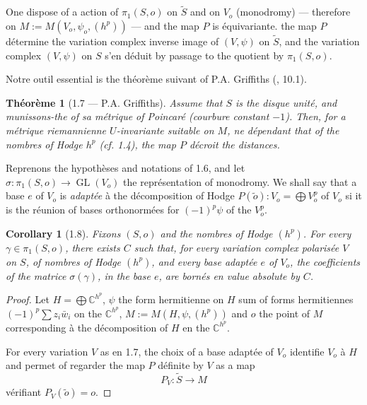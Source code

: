 \documentclass[12pt,a4paper]{article}
\theoremstyle{plain}
\newtheorem{theorem}{Th\'{e}or\`{e}me}[section]
\newtheorem{corollary}{Corollary}[section]
\theoremstyle{definition}
\DeclareMathOperator{\GL}{GL}
\newcommand{\CC}{\mathbb{C}}
\begin{document}
{One dispose of a action of $\pi_{1}(S,o)$ on $\widetilde{S}$ and on $V_{o}$ (monodromy) --- therefore on $M := M(V_{o}, \psi_{o}, (h^{p}))$ --- and the map $P$ is \'{e}quivariante. the map $P$ d\'{e}termine the variation complex inverse image of $(V, \psi)$ on $\widetilde{S}$, and the variation complex $(V, \psi)$ on $S$ s'en d\'{e}duit by passage to the quotient by $\pi_{1}(S,o)$.

Notre outil essential is the th\'{e}or\`{e}me suivant of P.A. Griffiths (\cite{GriffithsBull}, 10.1).

\begin{theorem}[1.7 --- P.A. Griffiths]
Assume that $S$ is the disque unit\'{e}, and munissons-the of sa m\'{e}trique of Poincar\'{e} (courbure constant $-1$). Then, for a m\'{e}trique riemannienne $U$-invariante suitable on $M$, ne d\'{e}pendant that of the nombres of Hodge $h^{p}$ (cf. 1.4), the map $P$ d\'{e}croit the distances.
\end{theorem}

Reprenons the hypoth\`{e}ses and notations of 1.6, and let $\sigma : \pi_{1}(S,o) \to \GL(V_{o})$ the repr\'{e}sentation of monodromy. We shall say that a base $e$ of $V_{o}$ is \emph{adapt\'{e}e} \`{a} the d\'{e}composition of Hodge $P(\tilde{o}) : V_{o} = \bigoplus V_{o}^{p}$ of $V_{o}$ si it is the r\'{e}union of bases orthonorm\'{e}es for $(-1)^{p}\psi$ of the $V_{o}^{p}$.

\begin{corollary}[1.8]
Fixons $(S,o)$ and the nombres of Hodge $(h^{p})$. For every $\gamma \in \pi_{1}(S,o)$, there exists $C$ such that, for every variation complex polaris\'{e}e $V$ on $S$, of nombres of Hodge $(h^{p})$, and every base adapt\'{e}e $e$ of $V_{o}$, the coefficients of the matrice $\sigma(\gamma)$, in the base $e$, are born\'{e}s en value absolute by $C$.
\end{corollary}

\begin{proof}
Let $H = \bigoplus \CC^{h^{p}}$, $\psi$ the form hermitienne on $H$ sum of forms hermitiennes $(-1)^{p}\sum z_{i}\bar{w}_{i}$ on the $\CC^{h^{p}}$, $M := M(H, \psi, (h^{p}))$ and $o$ the point of $M$ corresponding \`{a} the d\'{e}composition of $H$ en the $\CC^{h^{p}}$.

For every variation $V$ as en 1.7, the choix of a base adapt\'{e}e of $V_{o}$ identifie $V_{o}$ \`{a} $H$ and permet of regarder the map $P$ d\'{e}finite by $V$ as a map
\[
P_{V} : \widetilde{S} \to M
\]
v\'{e}rifiant $P_{V}(\tilde{o}) = o$.


\end{proof}}
\end{document}
